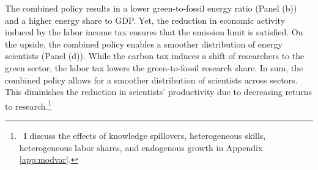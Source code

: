 The combined policy results in a lower green-to-fossil energy ratio (Panel (b)) and a higher energy share to GDP. Yet, the reduction in economic activity induced by the labor income tax ensures that the emission limit is satisfied. On the upside, the combined policy enables a smoother distribution of energy scientists (Panel (d)). While the carbon tax induces a shift of researchers to the green sector, the labor tax lowers the green-to-fossil research share. 
In sum, the combined policy allows for a smoother distribution of scientists across sectors. This diminishes the reduction in scientists' productivity due to decreasing returns to research.\footnote{\ I discuss the effects of knowledge spillovers, heterogeneous skills, heterogeneous labor shares, and endogenous growth in Appendix \ref{app:modvar}. }

